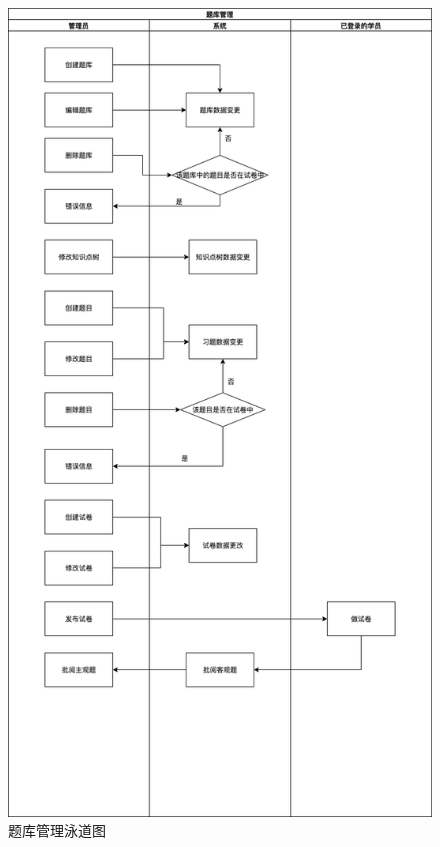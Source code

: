 \documentclass{article}
\begin{document}
    \begin{figure}[H]
        \centering
        \includegraphics[width=.8\textwidth]{QuestionBankManagement.png}
        \caption{题库管理泳道图}
        \label{题库管理泳道图}
    \end{figure}
    
\end{document}
